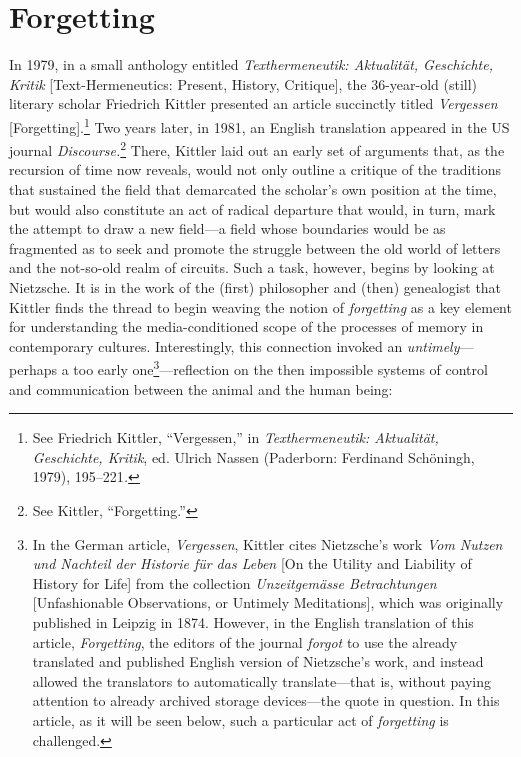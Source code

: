 \documentclass{tufte-handout}
\begin{document}
\hypertarget{forgetting}{%
\section{Forgetting}\label{forgetting}}

In 1979, in a small anthology entitled \emph{Texthermeneutik:
Aktualität, Geschichte, Kritik} {[}Text-Hermeneutics: Present, History,
Critique{]}, the 36-year-old (still) literary scholar Friedrich Kittler
presented an article succinctly titled \emph{Vergessen
}{[}Forgetting{]}.\footnote{See Friedrich Kittler, ``Vergessen,'' in
  \emph{Texthermeneutik: Aktualität, Geschichte, Kritik}, ed. Ulrich
  Nassen (Paderborn: Ferdinand Schöningh, 1979), 195--221\emph{.}} Two
years later, in 1981, an English translation appeared in the US journal
\emph{Discourse.}\footnote{See Kittler, ``Forgetting.''} There, Kittler
laid out an early set of arguments that, as the recursion of time now
reveals, would not only outline a critique of the traditions that
sustained the field that demarcated the scholar's own position at the
time, but would also constitute an act of radical departure that would,
in turn, mark the attempt to draw a new field---a field whose boundaries
would be as fragmented as to seek and promote the struggle between the
old world of letters and the not-so-old realm of circuits. Such a task,
however, begins by looking at Nietzsche. It is in the work of the
(first) philosopher and (then) genealogist that Kittler finds the thread
to begin weaving the notion of \emph{forgetting} as a key element for
understanding the media-conditioned scope of the processes of memory in
contemporary cultures. Interestingly, this connection invoked an
\emph{untimely}---perhaps a too early one\footnote{In the German
  article, \emph{Vergessen}, Kittler cites Nietzsche's work \emph{Vom
  Nutzen und Nachteil der Historie für das Leben} {[}On the Utility and
  Liability of History for Life{]} from the collection
  \emph{Unzeitgemässe Betrachtungen} {[}Unfashionable Observations, or
  Untimely Meditations{]}, which was originally published in Leipzig in
  1874. However, in the English translation of this article,
  \emph{Forgetting}, the editors of the journal \emph{forgot} to use the
  already translated and published English version of Nietzsche's work,
  and instead allowed the translators to automatically translate---that
  is, without paying attention to already archived storage devices---the
  quote in question. In this article, as it will be seen below, such a
  particular act of \emph{forgetting} is challenged.}---reflection on
the then impossible systems of control and communication between the
animal and the human being:
\end{document}
